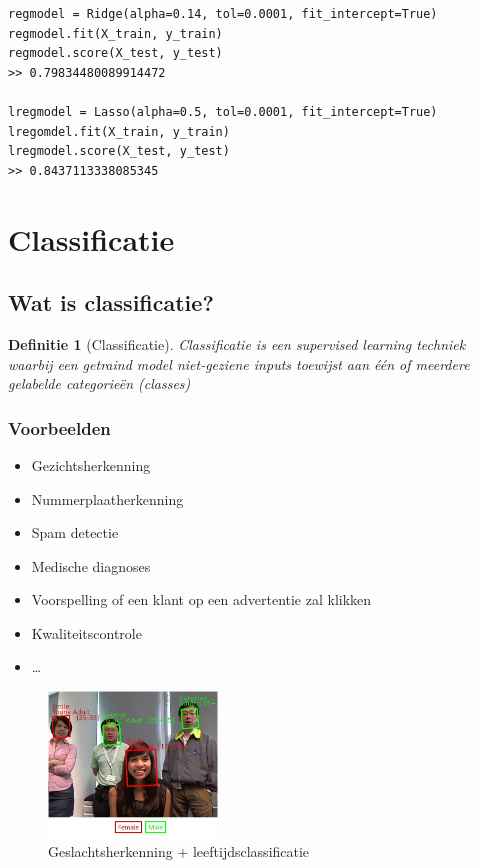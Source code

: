 \documentclass{article}
\newtheorem{theorem}{Definitie}[section]
\begin{document}
\begin{verbatim}
regmodel = Ridge(alpha=0.14, tol=0.0001, fit_intercept=True)
regmodel.fit(X_train, y_train)
regmodel.score(X_test, y_test)
>> 0.79834480089914472

lregmodel = Lasso(alpha=0.5, tol=0.0001, fit_intercept=True)
lregomdel.fit(X_train, y_train)
lregmodel.score(X_test, y_test)
>> 0.8437113338085345
\end{verbatim}

\section{Classificatie}

\subsection{Wat is classificatie?}

\begin{theorem}[Classificatie]
Classificatie is een supervised learning techniek waarbij een getraind model
niet-geziene inputs toewijst aan één of meerdere gelabelde categorieën (classes)
\end{theorem}

\subsubsection{Voorbeelden}

\begin{itemize}
    \item Gezichtsherkenning
    \item Nummerplaatherkenning
    \item Spam detectie
    \item Medische diagnoses
    \item Voorspelling of een klant op een advertentie zal klikken
    \item Kwaliteitscontrole
    \item \dots
\end{itemize}

\begin{figure}[H]
    \centering
    \includegraphics[width=0.4\textwidth]{classificatie-gezichtsherkenning.png}
    \caption{Geslachtsherkenning + leeftijdsclassificatie}
\end{figure}
\end{document}
